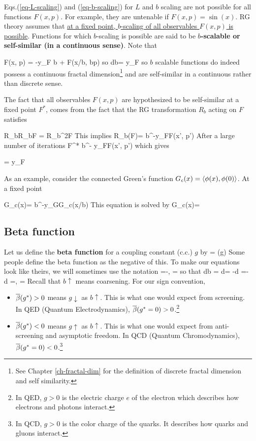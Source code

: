 Eqs.(\ref{eq-L-scaling})
and (\ref{eq-b-scaling}) for
$L$ and $b$ scaling 
are not possible for all functions
$F(x,p)$.
For example, they
are untenable if $F(x, p) = \sin(x)$. RG theory assumes that \ul{at a fixed point,
$b$-scaling of all observables $F(x, p)$ is possible}. 
Functions for which $b$-scaling
is possible are said to be {\bf $b$-scalable or self-similar (in a continuous sense)}.
Note that

\beq
\ln F(x, p) =
-y_F \ln b + \ln F(x/b, bp)
\eeq
so
\beq
{}
{d\ln b}= y_F
\eeq
so $b$ scalable functions do indeed 
possess a continuous fractal dimension\footnote{See Chapter \ref{ch-fractal-dim} for the definition of discrete fractal dimension and self similarity.} and are self-similar in a continuous rather than discrete sense.

The fact that all 
observables $F(x, p)$ are hypothesized
to be self-similar at a fixed point $F^*$, comes from the fact that the RG transformation $R_b$ acting on $F$ satisfies

\beq
R_{b}R_{b}F = R_{b^2}F
\eeq
This implies
\beq
R_b(F)= b^{-y_F}F(x', p')
\eeq
After a large number of iterations
\beq
F^* \approx b^{- y_F}F(x', p')
\eeq
which gives

\beq
{}= y_F
\eeq


As an example,
consider the connected Green's function $G_c(x) = \left\langle\phi(x), \phi(0)\right\rangle$.
At  a fixed point

\beq
G_c(x)= b^{-y_G}G_c(x/b)
\eeq
This equation is solved by
\beq
G_c(x)= 
\eeq




\subsection{Beta function}

Let us define the {\bf beta
function} for a coupling 
constant (c.c.) $g$ by
\beq
{} = \beta(g)
\eeq
Some people define the beta function as
the negative of this. 
To make our equations look like theirs,
we will sometimes use the notation
\beq
\ol{\beta}=-\beta, \quad \olmu=\Lam
\eeq
so that
\beq 
d\ln b = d\ln \mu = -\;d \ln \Lam=-\;d\ln\olmu
\label{eq-der-mu-Lam-b}
\eeq
\beq
{}=\beta, \quad
{}=\olbeta
\eeq
Recall that $b\uparrow$ means coarsening.
For
our sign convention, 


\begin{itemize}
\item $\overline{\beta}(g^*)>0$ means
$g\downarrow$ as $b\uparrow$. 
This is what one would expect from screening. In QED (Quantum Electrodynamics), 
$\overline{\beta}(g^*=0)>0$.\footnote{In QED, $g> 0$ is the electric charge $e$
of the electron which describes how
electrons and photons interact.}
\item
$\overline{\beta}(g^*)<0$ means
$g\uparrow$ as $b\uparrow$. 
This is what
 one would expect from anti-screening
and asymptotic freedom. In QCD (Quantum Chromodynamics), 
$\overline{\beta}(g^*=0)<0$.\footnote{In QCD, $g> 0$ is the color charge
of the quarks. It describes how
quarks and gluons interact.}
\end{itemize}

